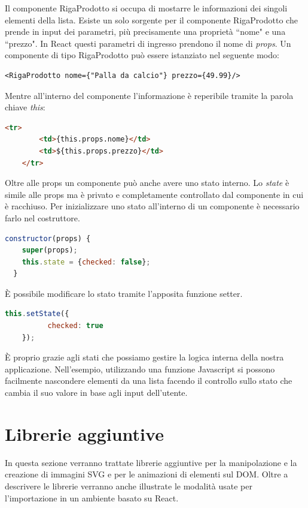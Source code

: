 \noindent Il componente RigaProdotto si occupa di mostarre le informazioni dei singoli elementi della lista. Esiste un solo sorgente per il componente RigaProdotto che prende in input dei parametri, più precisamente una proprietà ``nome" e una ``prezzo". In React questi parametri di ingresso prendono il nome di \textit{props}. Un componente di tipo RigaProdotto può essere istanziato nel seguente modo:
\begin{lstlisting}[language=HTML5]
    <RigaProdotto nome={"Palla da calcio"} prezzo={49.99}/>
\end{lstlisting}
Mentre all'interno del componente l'informazione è reperibile tramite la parola chiave \textit{this}:
\begin{lstlisting}[language=html]
    <tr>
        <td>{this.props.nome}</td>
        <td>${this.props.prezzo}</td>
    </tr>
\end{lstlisting}
Oltre alle props un componente può anche avere uno stato interno.
Lo \textit{state} è simile alle props ma è privato e completamente controllato dal componente in cui è racchiuso.
Per inizializzare uno stato all'interno di un componente è necessario farlo nel costruttore.
\begin{lstlisting}[language=Javascript]
  constructor(props) {
    super(props);
    this.state = {checked: false};
  }
\end{lstlisting}
È possibile modificare lo stato tramite l'apposita funzione setter.
\begin{lstlisting}[language=Javascript]
    this.setState({
          checked: true
    });
\end{lstlisting}
È proprio grazie agli stati che possiamo gestire la logica interna della nostra applicazione.\newline
Nell'esempio, utilizzando una funzione Javascript si possono facilmente nascondere elementi da una lista facendo il controllo sullo stato che cambia il suo valore in base agli input dell'utente.
\section{Librerie aggiuntive}   
\noindent In questa sezione verranno trattate librerie aggiuntive per la manipolazione e la creazione di immagini SVG e per le animazioni di elementi sul DOM. Oltre a descrivere le librerie verranno anche illustrate le modalità usate per l'importazione in un ambiente basato su React.

